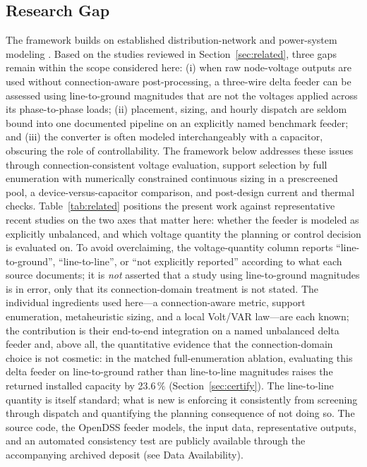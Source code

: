 \documentclass{ieeeaccess}
\providecommand{\percent}{\%}
\newcommand{\SI}[2]{#1\,\ensuremath{\mathrm{#2}}}
\begin{document}
\subsection{Research Gap}
The framework builds on established distribution-network and power-system modeling
\cite{baran1989reconfig,sallam2011distribution,kundur1994stability}. Based on the
studies reviewed in Section~\ref{sec:related}, three gaps remain within the scope
considered here: (i) when raw node-voltage outputs are used without
connection-aware post-processing, a three-wire delta feeder can be assessed using
line-to-ground magnitudes that are not the voltages applied across its phase-to-phase
loads; (ii) placement, sizing, and
hourly dispatch are seldom bound into one documented pipeline on an explicitly
named benchmark feeder; and (iii) the converter is often modeled interchangeably
with a capacitor, obscuring the role of controllability. The framework below
addresses these issues through connection-consistent voltage evaluation, support
selection by full enumeration with numerically constrained continuous sizing in a
prescreened pool, a device-versus-capacitor comparison, and post-design current and
thermal checks.
Table~\ref{tab:related} positions the present work against representative recent
studies on the two axes that matter here: whether the feeder is modeled as
explicitly unbalanced, and which voltage quantity the planning or control decision
is evaluated on. To avoid overclaiming, the voltage-quantity column reports
``line-to-ground'', ``line-to-line'', or ``not explicitly reported'' according to
what each source documents; it is \emph{not} asserted that a study using
line-to-ground magnitudes is in error, only that its connection-domain treatment is
not stated. The individual ingredients used here---a connection-aware metric,
support enumeration, metaheuristic sizing, and a local Volt/VAR law---are each
known; the contribution is their end-to-end integration on a named unbalanced delta
feeder and, above all, the quantitative evidence that the connection-domain choice
is not cosmetic: in the matched full-enumeration ablation, evaluating this delta
feeder on line-to-ground rather than line-to-line magnitudes raises the returned
installed capacity by \SI{23.6}{\percent} (Section~\ref{sec:certify}). The
line-to-line quantity is itself standard; what is new is enforcing it consistently
from screening through dispatch and quantifying the planning consequence of not
doing so. The source code, the OpenDSS feeder models, the input data, representative
outputs, and an automated consistency test are publicly available through the
accompanying archived deposit (see Data Availability).
\end{document}
